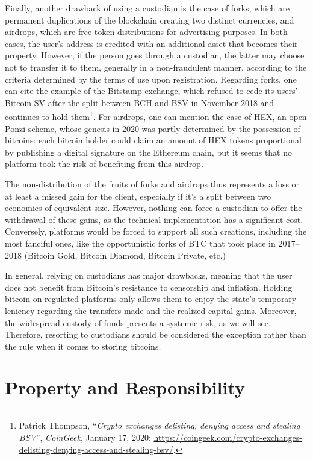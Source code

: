 \documentclass[
  a5paper,
  smalldemyvopaper,10pt,twoside,onecolumn,openright,extrafontsizes,hidelinks]{memoir}
\newlength\drop
\begin{document}
Finally, another drawback of using a custodian is the case of forks,
which are permanent duplications of the blockchain creating two distinct
currencies, and airdrops, which are free token distributions for
advertising purposes. In both cases, the user's address is credited with
an additional asset that becomes their property. However, if the person
goes through a custodian, the latter may choose not to transfer it to
them, generally in a non-fraudulent manner, according to the criteria
determined by the terms of use upon registration. Regarding forks, one
can cite the example of the Bitstamp exchange, which refused to cede its
users' Bitcoin SV after the split between BCH and BSV in November 2018
and continues to hold them\footnote{Patrick Thompson, ``\emph{Crypto
  exchanges delisting, denying access and stealing BSV}'',
  \emph{CoinGeek}, January 17, 2020:
  \url{https://coingeek.com/crypto-exchanges-delisting-denying-access-and-stealing-bsv/}.}.
For airdrops, one can mention the case of HEX, an open Ponzi scheme,
whose genesis in 2020 was partly determined by the possession of
bitcoins: each bitcoin holder could claim an amount of HEX tokens
proportional by publishing a digital signature on the Ethereum chain,
but it seems that no platform took the risk of benefiting from this
airdrop.

The non-distribution of the fruits of forks and airdrops thus represents
a loss or at least a missed gain for the client, especially if it's a
split between two economies of equivalent size. However, nothing can
force a custodian to offer the withdrawal of these gains, as the
technical implementation has a significant cost. Conversely, platforms
would be forced to support all such creations, including the most
fanciful ones, like the opportunistic forks of BTC that took place in
2017--2018 (Bitcoin Gold, Bitcoin Diamond, Bitcoin Private, etc.)

In general, relying on custodians has major drawbacks, meaning that the
user does not benefit from Bitcoin's resistance to censorship and
inflation. Holding bitcoin on regulated platforms only allows them to
enjoy the state's temporary leniency regarding the transfers made and
the realized capital gains. Moreover, the widespread custody of funds
presents a systemic risk, as we will see. Therefore, resorting to
custodians should be considered the exception rather than the rule when
it comes to storing bitcoins.

\section*{Property and
Responsibility}\label{property-and-responsibility}
\end{document}
